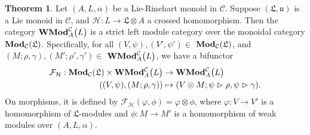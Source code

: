 \documentclass[11pt]{amsart}
\newcommand{\calC}{\mathcal{C}}
\theoremstyle{definition}
\newtheorem{theor}[theo]{Theorem}
\numberwithin{equation}{section}
\begin{document}
\begin{theor}\label{maintheorem}
Let $(A,L,\alpha)$ be a Lie-Rinehart monoid in $\calC$. Suppose  $(\mathfrak{L}, \mathfrak{u})$ is a Lie monoid in $\calC$, and $\mathcal{H}: L \rightarrow \mathfrak{L}\otimes A$  a crossed homomorphism. Then the category ${\bf WMod}^{\calC}_A{\big(L\big)}$ is a strict left module category over the monoidal category $\mathrm{ \bf Mod}_{\calC}(\mathfrak{L})$. Specifically, for all $(V,\psi), (V', \psi')\in $ $\mathrm{ \bf Mod}_{\calC}(\mathfrak{L})$, and $(M;\rho, \gamma), (M'; \rho',\gamma') \in$ ${\bf WMod}^{\calC}_A{\big(L\big)}$,  we have a bifunctor
\begin{align*}
				\mathcal{F}_{\mathcal{H}}: \mathrm{ \bf Mod}_{\calC}(\mathfrak{L}) \times {\bf WMod}^{\calC}_A{\big(L\big)} &\rightarrow {\bf WMod}^{\calC}_A{\big(L\big)} \\
				((V,\psi), (M; \rho,\gamma) ) & \mapsto (V\otimes M; \psi \vartriangleright \rho, \psi \vartriangleright \gamma ).
\end{align*}
On morphisms, it is defined by $\mathcal{F}_{\mathcal{H}}(\varphi, \phi)=\varphi\otimes \phi$, where $\varphi:V\to V'$ is a homomorphism of $\mathfrak{L}$-modules and $\phi:M\to M'$ is a homomorphism of weak modules over $(A,L,\alpha)$. 
\end{theor}
\end{document}
